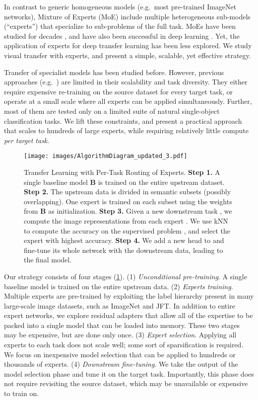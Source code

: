 \documentclass{article}
\begin{document}
In contrast to generic homogeneous models (e.g.\ most pre-trained ImageNet networks), Mixture of Experts (MoE) include 
multiple heterogeneous sub-models (``experts'') that specialize to sub-problems of the full task.
MoEs have been studied for decades \cite{eigen2013learning, jacobs1993learning}, and have also been successful 
in deep learning \cite{shazeer2017outrageously}.
Yet, the application of experts for deep transfer learning has been less explored.
We study visual transfer with experts, and present a simple, scalable, yet effective strategy.

Transfer of specialist models has been studied before.
However, previous approaches (e.g.~\cite{ngiam2018domain,dvornik2020selecting,yan2020neural}) are limited in their scalability and task diversity.
They either require expensive re-training on the source dataset for every target task,
or operate at a small scale where all experts can be applied simultaneously.
Further, most of them are tested only on a limited suite of natural single-object classification tasks. We lift these constraints, and present a practical approach that scales to hundreds of large experts, while requiring relatively little compute \emph{per target task}. 

\begin{figure}[tb]
\centering
  \texttt{[image: images/AlgorithmDiagram\_updated\_3.pdf]}
  \caption{Transfer Learning with Per-Task Routing of Experts.
  \textbf{Step 1.} A single baseline model \textbf{B} is trained on the entire upstream dataset.
  \textbf{Step 2.} The upstream data is divided in semantic subsets (possibly overlapping). One expert is trained on each subset 
  using the weights from \textbf{B} as initialization.
  \textbf{Step 3.} Given a new downstream task , we compute the image representations  from each expert . We use kNN to compute the accuracy on the supervised problem , and select the expert  with highest accuracy.
  \textbf{Step 4.} We add a new head to 
  and fine-tune its whole network with the downstream data, leading to the final model.
  \label{fig:algorithm_overview}}
  \vspace{-1em}
\end{figure}

Our strategy consists of four stages (\cref{fig:algorithm_overview}).
(1) \emph{Unconditional pre-training}. A single baseline model is trained on the entire upstream data.
(2) \emph{Experts training}.
Multiple experts are pre-trained by exploiting the label hierarchy present in many large-scale image datasets, such as ImageNet and JFT.
In addition to entire expert networks, we explore residual adapters
that allow all of the expertise to be packed into a single model that can be loaded into memory.
These two stages may be expensive, but are done only once.
(3) \emph{Expert selection}.
Applying all experts to each task does not scale well; some sort of sparsification is required.
We focus on inexpensive model selection that can be applied to hundreds or thousands of experts.
(4) \emph{Downstream fine-tuning}.
We take the output of the model selection phase and tune it on the target task.
Importantly, this phase does not require revisiting the source dataset, which may be unavailable or expensive to train on.
\end{document}
